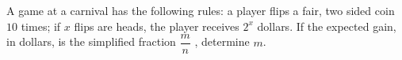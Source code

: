 A game at a carnival has the following rules: a player flips a fair, two sided coin $10$ times; if $x$ flips are heads, the player receives $2^x$ dollars. If the expected gain, in dollars, is the simplified fraction  $\dfrac{m}{n}$  , determine $m$.
